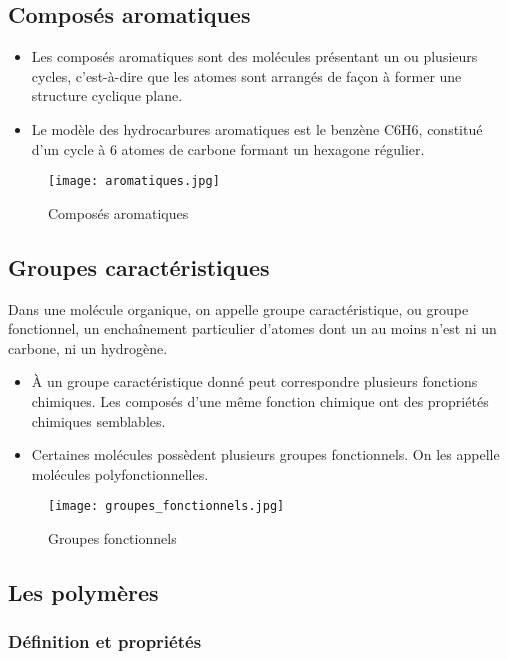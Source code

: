 \documentclass{article}
\begin{document}
\subsection{Composés aromatiques}

\begin{itemize}[noitemsep]
  \item Les composés aromatiques sont des molécules présentant un ou plusieurs cycles, c'est-à-dire que les atomes sont arrangés de façon à former une structure cyclique plane.
  \item Le modèle des hydrocarbures aromatiques est le benzène C6H6, constitué d'un cycle à 6 atomes de carbone formant un hexagone régulier.
\end{itemize}

\begin{figure}[H]
  \centering
  \texttt{[image: aromatiques.jpg]}
  \caption{\label{} Composés aromatiques}
\end{figure}


\subsection{Groupes caractéristiques}

Dans une molécule organique, on appelle groupe caractéristique, ou groupe fonctionnel, un enchaînement particulier d'atomes dont un au moins n'est ni un carbone, ni un hydrogène.
\begin{itemize}
    \item À un groupe caractéristique donné peut correspondre plusieurs fonctions chimiques. Les composés d'une même fonction chimique ont des propriétés chimiques semblables.
    \item Certaines molécules possèdent plusieurs groupes fonctionnels. On les appelle molécules polyfonctionnelles.
\end{itemize}

\begin{figure}[H]
  \centering
  \texttt{[image: groupes\_fonctionnels.jpg]}
  \caption{\label{} Groupes fonctionnels}
\end{figure}

\subsection{Les polymères}

\subsubsection{Définition et propriétés}
\end{document}
